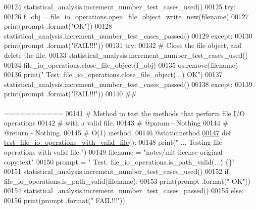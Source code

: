 \begin{DoxyCode}
00124         statistical\_analysis.increment\_number\_test\_cases\_used()
00125         \textcolor{keywordflow}{try}:
00126             f\_obj = file\_io\_operations.open\_file\_object\_write\_new(filename)
00127             print(prompt .format(\textcolor{stringliteral}{"OK"}))
00128             statistical\_analysis.increment\_number\_test\_cases\_passed()
00129         \textcolor{keywordflow}{except}:
00130             print(prompt .format(\textcolor{stringliteral}{"FAIL!!!"}))
00131         \textcolor{keywordflow}{try}:
00132             \textcolor{comment}{#   Close the file object, and delete the file.}
00133             statistical\_analysis.increment\_number\_test\_cases\_used()
00134             file\_io\_operations.close\_file\_object(f\_obj)
00135             os.remove(filename)
00136             print(\textcolor{stringliteral}{" Test: file\_io\_operations.close\_file\_object(...)     OK"})
00137             statistical\_analysis.increment\_number\_test\_cases\_passed()
00138         \textcolor{keywordflow}{except}:
00139             print(prompt .format(\textcolor{stringliteral}{"FAIL!!!"}))
00140     \textcolor{comment}{## =========================================================}
00141     \textcolor{comment}{#   Method to test the methods that perform file I/O operations}
00142     \textcolor{comment}{#       with a valid file.}
00143     \textcolor{comment}{#   @param - Nothing}
00144     \textcolor{comment}{#   @return - Nothing.}
00145     \textcolor{comment}{#   O(1) method.}
00146     @staticmethod
\hypertarget{file__io__tester_8py_source_l00147}{}\hyperlink{classutilities_1_1file__io__tester_1_1file__io__operations__tester_a9683b5a406697686900d28455bd3d5c3}{00147}     \textcolor{keyword}{def }\hyperlink{classutilities_1_1file__io__tester_1_1file__io__operations__tester_a9683b5a406697686900d28455bd3d5c3}{test\_file\_io\_operations\_with\_valid\_file}():
00148         print(\textcolor{stringliteral}{" ... Testing file operations with valid file."})
00149         filename = \textcolor{stringliteral}{"notes/mit-license-original-copy.text"}
00150         prompt = \textcolor{stringliteral}{"  Test: file\_io\_operations.is\_path\_valid(...) \{\}"}
00151         statistical\_analysis.increment\_number\_test\_cases\_used()
00152         \textcolor{keywordflow}{if} file\_io\_operations.is\_path\_valid(filename):
00153             print(prompt .format(\textcolor{stringliteral}{"  OK"}))
00154             statistical\_analysis.increment\_number\_test\_cases\_passed()
00155         \textcolor{keywordflow}{else}:
00156             print(prompt .format(\textcolor{stringliteral}{"  FAIL!!!"}))

\end{DoxyCode}
